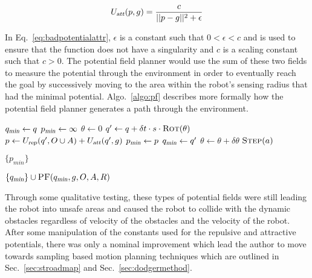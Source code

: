 \begin{equation}
    U_{\Var{att}}(p, g) = \frac{c}{||p - g||^2 + \epsilon}
    \label{eq:badpotentialattr}
\end{equation}

In Eq.~\ref{eq:badpotentialattr}, $\epsilon$ is a constant such that $0 <
\epsilon < c$ and is used to ensure that the function does not have a
singularity and $c$ is a scaling constant such that $c > 0$. The potential
field planner would use the sum of these two fields to measure the potential
through the environment in order to eventually reach the goal by successively
moving to the area within the robot's sensing radius that had the minimal
potential. Algo.~\ref{algo:pf} describes more formally how the potential field
planner generates a path through the environment.

\begin{algorithm}[ht]

    \caption{$\Function{PF}(q, g, O, A, R)$}

    \label{algo:pf}
    \begin{algorithmic}[1]
        \setcounter{ALC@line}{0}
        \vspace*{1mm}

        \STATE $q_{\Var{min}} \leftarrow q$
        \STATE $p_{\Var{min}} \leftarrow \infty$
        \STATE $\theta \leftarrow 0$
        \WHILE {$\theta \leq 2\pi$}
            \STATE $q' \leftarrow q + \delta t \cdot s \cdot
            \Function{Rot}(\theta)$
            \STATE $p \leftarrow U_{\Var{rep}}(q', O \cup A)
            + U_{\Var{att}}(q', g)$
               \STATE $p_{\Var{min}} \leftarrow p$
                \STATE $q_{\Var{min}} \leftarrow q'$
            \ENDIF
            \STATE $\theta \leftarrow \theta + \delta \theta$
                \STATE $\Function{Step}(a)$
            \ENDFOR
        \ENDWHILE

            \RETURN $\{p_{min}\}$
        \ENDIF

        \RETURN $\{q_{\Var{min}}\} \cup \Function{PF}(q_{\Var{min}}, g, O, A, R)$
    \end{algorithmic}
\end{algorithm}

Through some qualitative testing, these types of potential fields were still
leading the robot into unsafe areas and caused the robot to collide with the
dynamic obstacles regardless of velocity of the obstacles and the velocity of
the robot. After some manipulation of the constants used for the repulsive and
attractive potentials, there was only a nominal improvement which lead the
author to move towards sampling based motion planning techniques which are
outlined in Sec.~\ref{sec:stroadmap} and Sec.~\ref{sec:dodgermethod}.


